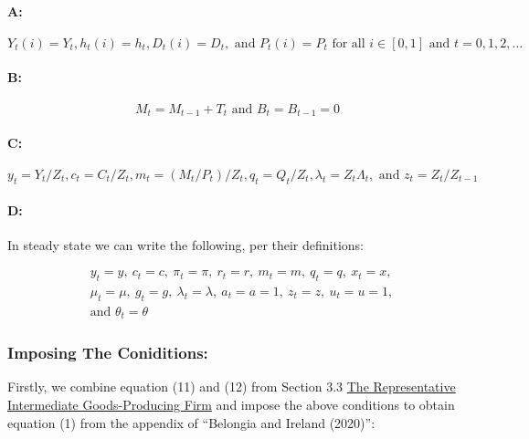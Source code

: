 \documentclass[11pt,preprint, authoryear]{elsarticle}
\numberwithin{equation}{section}
\numberwithin{figure}{section}
\numberwithin{table}{section}
\begin{document}
\hypertarget{a}{%
\paragraph{A:}\label{a}}

\[Y_{t}(i)=Y_{t}, h_{t}(i)=h_{t}, D_{t}(i)=D_{t}, \text { and } P_{t}(i)=P_{t} \text { for all } i \in[0,1] \text { and } t=0,1,2, \ldots\]

\hypertarget{b}{%
\paragraph{B:}\label{b}}

\[M_{t}=M_{t-1}+T_{t} \text { and } B_{t}=B_{t-1}=0\]

\hypertarget{c}{%
\paragraph{C:}\label{c}}

\[y_{t}=Y_{t} / Z_{t}, c_{t}=C_{t} / Z_{t}, m_{t}=\left(M_{t} / P_{t}\right) / Z_{t}, q_{t}=Q_{t} / Z_{t}, \lambda_{t}=Z_{t} \Lambda_{t}, \text { and } z_{t}=Z_{t} / Z_{t-1}\]

\hypertarget{d}{%
\paragraph{D:}\label{d}}

In steady state we can write the following, per their definitions:

\[\begin{aligned} & y_{t}=y,\ c_{t}=c,\ \pi_{t}=\pi,\ r_{t}=r, \ m_{t}=m,\ q_{t}=q,\ x_{t}=x,\ \\ 
& \mu_{t}=\mu,\ g_{t}=g,\ \lambda_{t}=\lambda,\ a_{t}=a=1,\ z_{t}=z,\ u_{t}=u=1, \\ 
& \text {and } \theta_{t}=\theta \end{aligned}\]

\hypertarget{imposing-the-coniditions}{%
\subsubsection{Imposing The
Coniditions:}\label{imposing-the-coniditions}}

Firstly, we combine equation (11) and (12) from Section 3.3
\protect\hyperlink{the-representative-intermediate-goods-producing-firm}{The
Representative Intermediate Goods-Producing Firm} and impose the above
conditions to obtain equation (1) from the appendix of ``Belongia and
Ireland (2020)'':
\end{document}
